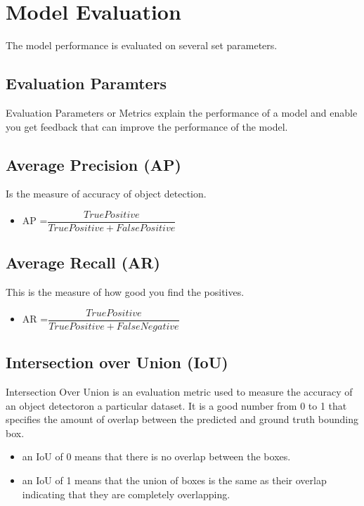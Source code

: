 \documentclass[12pt]{report}
\begin{document}
\section{Model Evaluation}
The model performance is evaluated on several set parameters.

\subsection{Evaluation Paramters}
Evaluation Parameters or Metrics explain the performance of a model and enable you get feedback that can improve the performance of the model.


\subsection {Average Precision (AP) }
Is the measure of accuracy of object detection.
\begin{itemize}[topsep=0pt]

\item AP =$\dfrac{True Positive}{True Positive + False Positive}$
\end{itemize}


\subsection {Average Recall (AR)}
This is the measure of how good you find the positives.

\begin{itemize}[topsep=0pt]
\item AR =$\dfrac{True Positive}{True Positive + False Negative}$
\end{itemize}


\subsection {Intersection over Union (IoU)}
Intersection Over Union is an evaluation metric used to measure the accuracy of an object detectoron a particular dataset. It is a good number from 0 to 1 that specifies the amount of overlap between the predicted and ground truth bounding box\cite{IoU}.

\begin{itemize}[topsep=0pt]
\item an IoU of 0 means that there is no overlap between the boxes.

\item an IoU of 1 means that the union of boxes is the same as their overlap indicating that they are completely overlapping.
\end{itemize}
\end{document}
